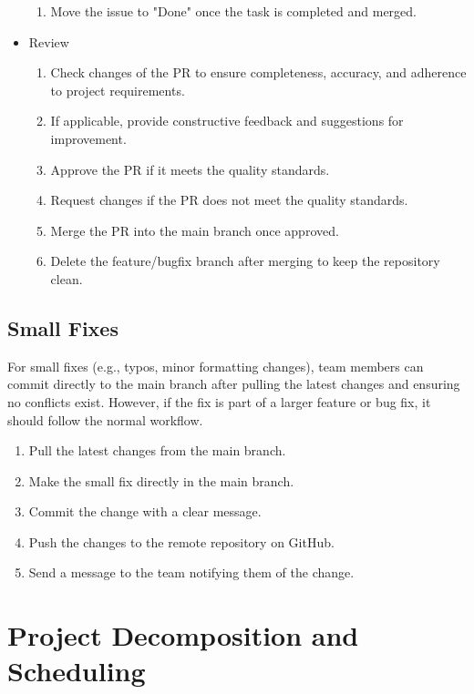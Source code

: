 \documentclass{article}
\begin{document}
\begin{itemize}
\begin{enumerate}
      \item Move the issue to "Done" once the task is completed and merged.
    \end{enumerate}
  \item Review
    \begin{enumerate}
      \item Check changes of the PR to ensure completeness, accuracy, and adherence to project requirements.
      \item If applicable, provide constructive feedback and suggestions for improvement.
      \item Approve the PR if it meets the quality standards.
      \item Request changes if the PR does not meet the quality standards.
      \item Merge the PR into the main branch once approved.
      \item Delete the feature/bugfix branch after merging to keep the repository clean.
    \end{enumerate}
\end{itemize}

\subsection{Small Fixes}
For small fixes (e.g., typos, minor formatting changes), 
team members can commit directly to the main branch after 
pulling the latest changes and ensuring no conflicts 
exist. However, if the fix is part of a larger feature 
or bug fix, it should follow the normal workflow.
\begin{enumerate}
  \item Pull the latest changes from the main branch.
  \item Make the small fix directly in the main branch.
  \item Commit the change with a clear message.
  \item Push the changes to the remote repository on GitHub.
  \item Send a message to the team notifying them of the change.
\end{enumerate}

\section{Project Decomposition and Scheduling}

\end{document}
